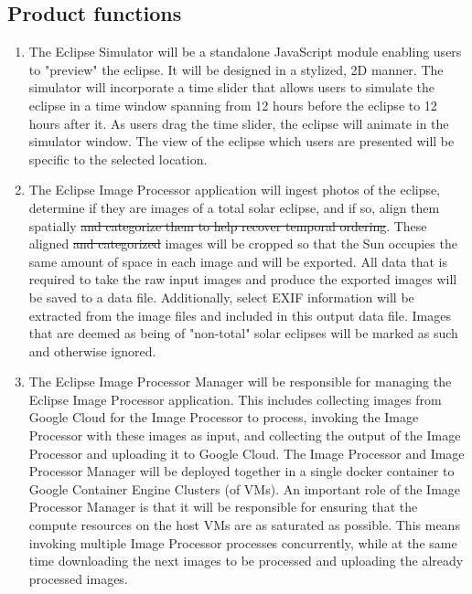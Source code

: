 \documentclass[10pt, onecolumn, draftclsnofoot, letterpaper, compsoc]{IEEEtran}
\begin{document}
\subsection{Product functions}
	\begin{enumerate}
		\item The Eclipse Simulator will be a standalone JavaScript 
		module enabling users to "preview" the eclipse. It will be 
		designed in a stylized, 2D manner. The simulator will 
		incorporate a time slider that allows users to simulate the 
		eclipse in a time window spanning from 12 hours before the 
		eclipse to 12 hours after it. As users drag the time 
		slider, the eclipse will animate in the simulator window. 
		The view of the eclipse which users are presented will be 
		specific to the selected location.

		\item The Eclipse Image Processor application will ingest 
		photos of the eclipse, determine if they are images of a 
		total solar eclipse, and if so, align them spatially
		\sout{and categorize them to help recover temporal ordering}. 
		These aligned \sout{and categorized}
		images will be cropped so that the Sun 
		occupies the same amount of space in each image and will be 
		exported. All data that is required to take the raw input 
		images and produce the exported images will be saved to a 
		data file. Additionally, select EXIF information will be 
		extracted from the image files and included in this output
		data file. Images that are deemed as being of "non-total" solar
		eclipses will be marked as such and otherwise ignored.

		\item The Eclipse Image Processor Manager will be responsible for 
		managing the Eclipse Image Processor application. This includes 
		collecting images from Google Cloud for the Image Processor to process,
		invoking the Image Processor with these images as input, and collecting 
		the output of the Image Processor and uploading it to Google Cloud. The 
		Image Processor and Image Processor Manager will be deployed together 
		in a single docker container to Google Container Engine Clusters (of VMs).
		An important role of the Image Processor Manager is that it will be responsible 
		for ensuring that the compute resources on the host VMs are as saturated as 
		possible. This means invoking multiple Image Processor processes concurrently, 
		while at the same time downloading the next images to be processed and uploading 
		the already processed images.
		
		
	\end{enumerate}
\end{document}
